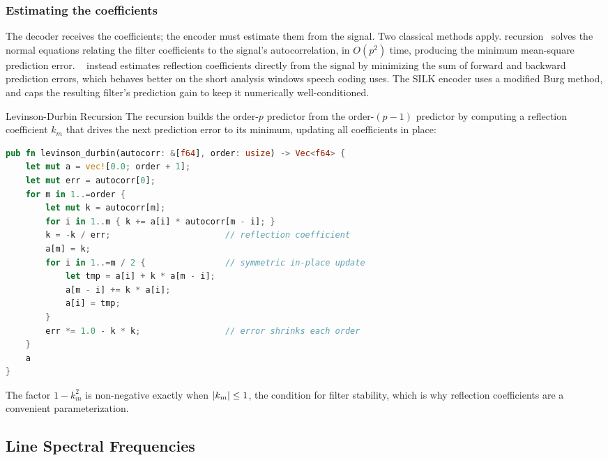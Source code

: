 \subsubsection{Estimating the coefficients}

The decoder receives the coefficients; the encoder must estimate them from the
signal. Two classical methods apply. 
recursion~\cite{levinson1947wiener} solves the normal equations relating the
filter coefficients to the signal's autocorrelation, in $O(p^2)$ time, producing
the minimum mean-square prediction error. ~\cite{burg1975maximum} instead estimates reflection
coefficients directly
from the signal by minimizing the sum of forward and backward prediction errors,
which behaves better on the short analysis windows speech coding uses. The SILK
encoder uses a modified Burg method, and caps the resulting filter's prediction
gain to keep it numerically well-conditioned.

\begin{implementation}{Levinson-Durbin Recursion}
  The recursion builds the order-$p$ predictor from the order-$(p-1)$ predictor
  by computing a reflection coefficient $k_m$ that drives the next prediction
  error to its minimum, updating all coefficients in place:
  \begin{lstlisting}[language=Rust]
pub fn levinson_durbin(autocorr: &[f64], order: usize) -> Vec<f64> {
    let mut a = vec![0.0; order + 1];
    let mut err = autocorr[0];
    for m in 1..=order {
        let mut k = autocorr[m];
        for i in 1..m { k += a[i] * autocorr[m - i]; }
        k = -k / err;                       // reflection coefficient
        a[m] = k;
        for i in 1..=m / 2 {                // symmetric in-place update
            let tmp = a[i] + k * a[m - i];
            a[m - i] += k * a[i];
            a[i] = tmp;
        }
        err *= 1.0 - k * k;                 // error shrinks each order
    }
    a
}
  \end{lstlisting}
  The factor $1 - k_m^2$ is non-negative exactly when $\lvert k_m\rvert \le 1$, the
  condition for filter stability, which is why reflection coefficients are a
  convenient parameterization.
\end{implementation}

\subsection{Line Spectral Frequencies}\label{subsec:silk_nlsf}


